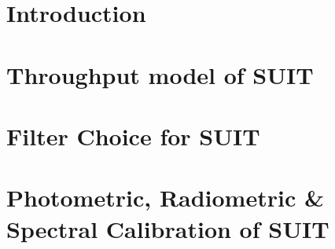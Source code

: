 
\section{Introduction}\label{secc3_intro}

\section{Throughput model of SUIT}\label{sec:suit_throughput}

\section{Filter Choice for SUIT}\label{sec:filter_choice}

\section{Photometric, Radiometric \& Spectral Calibration of SUIT}\label{sec:suit_cal}
